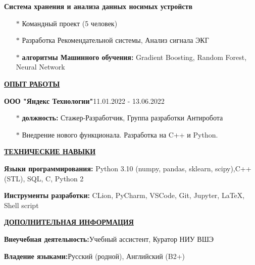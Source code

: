 \documentclass[11pt]{article}
\begin{document}
\par \textbf{Система хранения и анализа данных носимых устройств}
\begin{itemize}
\item[$\ast$] Командный проект (5 человек)
\item[$\ast$] Разработка Рекомендательной системы, Анализ сигнала ЭКГ
\item[$\ast$] \textbf{алгоритмы Машинного обучения:} Gradient Boosting, Random Forest, Neural Network
\end{itemize}

\noindent \textbf{\underline{ОПЫТ РАБОТЫ}} \\
\par \textbf{ООО "Яндекс Технологии"}\hfill 11.01.2022 - 13.06.2022
\begin{itemize}
    \item[$\ast$] \textbf{должность:} Стажер-Разработчик, Группа разработки Антиробота
    \item[$\ast$] Внедрение нового функционала. Разработка на C++ и Python. 
\end{itemize}

\noindent \textbf{\underline{ТЕХНИЧЕСКИЕ НАВЫКИ}}\\
 \par \textbf{Языки программирования:} \hfill Python 3.10 (numpy, pandas, sklearn, scipy),C++ (STL), SQL, C, Python 2\\
\par \textbf{Инструменты разработки:} \hfill CLion, PyCharm, VSCode, Git, Jupyter, \LaTeX{}, Shell script

\noindent \textbf{\underline{ДОПОЛНИТЕЛЬНАЯ ИНФОРМАЦИЯ}} \\
\par \textbf{Внеучебная деятельность:}\hfill Учебный ассистент, Куратор НИУ ВШЭ \\
\par \textbf{Владение языками:}\hfill Русский (родной), Английский (B2+)
\end{document}
